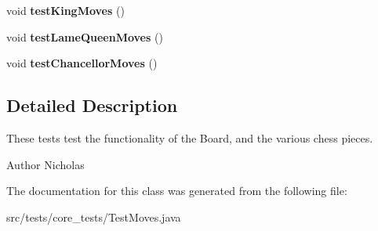 \begin{DoxyCompactItemize}
\item 
\hypertarget{classtests_1_1core__tests_1_1_test_moves_a9e4e775400a68f01cc2f61f3f7dbae1a}{void {\bfseries test\-King\-Moves} ()}\label{classtests_1_1core__tests_1_1_test_moves_a9e4e775400a68f01cc2f61f3f7dbae1a}

\item 
\hypertarget{classtests_1_1core__tests_1_1_test_moves_a1402021b36f732856fc6007df754f143}{void {\bfseries test\-Lame\-Queen\-Moves} ()}\label{classtests_1_1core__tests_1_1_test_moves_a1402021b36f732856fc6007df754f143}

\item 
\hypertarget{classtests_1_1core__tests_1_1_test_moves_a27dd9dabc0a99b27e53a2d00dbd61134}{void {\bfseries test\-Chancellor\-Moves} ()}\label{classtests_1_1core__tests_1_1_test_moves_a27dd9dabc0a99b27e53a2d00dbd61134}

\end{DoxyCompactItemize}


\subsection{Detailed Description}
These tests test the functionality of the Board, and the various chess pieces.

\begin{DoxyAuthor}{Author}
Nicholas 
\end{DoxyAuthor}


The documentation for this class was generated from the following file\-:\begin{DoxyCompactItemize}
\item 
src/tests/core\-\_\-tests/Test\-Moves.\-java\end{DoxyCompactItemize}
